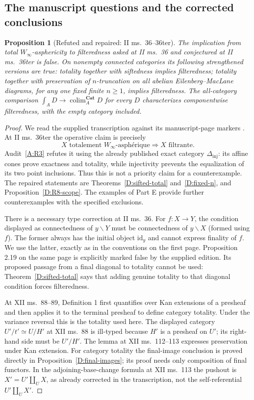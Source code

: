 \documentclass[11pt,a4paper]{article}
\newcommand{\Cat}{\mathbf{Cat}}
\newcommand{\colim}{\operatorname*{colim}}
\newcommand{\id}{\mathrm{id}}
\newcommand{\Dinj}{\Delta_{\mathrm{inj}}}
\newtheorem{proposition}[theorem]{Proposition}
\theoremstyle{definition}
\begin{document}
\subsection{The manuscript questions and the corrected conclusions}
\begin{proposition}[Refuted and repaired: II ms.\ 36--36ter]\label{F:manuscript}
The implication from total $W_\infty$-asphericity to filteredness asked at II ms.\ 36 and conjectured at II ms.\ 36ter is false. On nonempty connected categories its following strengthened versions are true: totality together with siftedness implies filteredness; totality together with preservation of $n$-truncation on all abelian Eilenberg--MacLane diagrams, for any one fixed finite $n\geq1$, implies filteredness. The all-category comparison $\int_A D\to\colim_A^{\Cat}D$ for every $D$ characterizes componentwise filteredness, with the empty category included.
\end{proposition}
\begin{proof}
We read the supplied transcription against its manuscript-page markers \citep{GrothendieckDerivateurs}. At II ms.\ 36ter the operative claim is precisely
\[
 X\text{ totalement }W_\infty\text{-asph\'erique}
 \Longrightarrow X\text{ filtrante}.
\]
Audit~\ref{A:R3} refutes it using the already published exact category $\Dinj$: its affine cones prove exactness and totality, while injectivity prevents the equalization of its two point inclusions. Thus this is not a priority claim for a counterexample. The repaired statements are Theorems~\ref{D:sifted-total} and~\ref{D:fixed-n}, and Proposition~\ref{D:R8-scope}. The examples of Part E provide further counterexamples with the specified exclusions.

There is a necessary type correction at II ms.\ 36. For $f:X\to Y$, the condition displayed as connectedness of $y\backslash Y$ must be connectedness of $y\backslash X$ (formed using $f$). The former always has the initial object $\id_y$ and cannot express finality of $f$. We use the latter, exactly as in the conventions on the first page. Proposition 2.19 on the same page is explicitly marked false by the supplied edition. Its proposed passage from a final diagonal to totality cannot be used: Theorem~\ref{D:sifted-total} says that adding genuine totality to that diagonal condition forces filteredness.

At XII ms.\ 88--89, Definition 1 first quantifies over Kan extensions of a presheaf and then applies it to the terminal presheaf to define category totality. Under the variance reversal this is the totality used here. The displayed category $U'/t'\simeq U/H'$ at XII ms.\ 88 is ill-typed because $H'$ is a presheaf on $U'$; its right-hand side must be $U'/H'$. The lemma at XII ms.\ 112--113 expresses preservation under Kan extension. For category totality the final-image conclusion is proved directly in Proposition~\ref{D:final-images}; its proof needs only composition of final functors. In the adjoining-base-change formula at XII ms.\ 113 the pushout is $X'=U'\amalg_U X$, as already corrected in the transcription, not the self-referential $U'\amalg_U X'$.
\end{proof}
\end{document}
